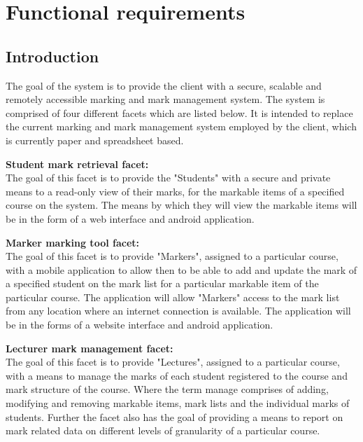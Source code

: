 \documentclass[12pt]{article}
\begin{document}
		
	
	\section{Functional requirements}
	
		\vspace{0.2in}
		
		\subsection{Introduction}
			\begin{flushleft}
				\vspace{0.2in}
	
				The goal of the system is to provide the client with a secure, scalable and remotely accessible marking and mark management system. The system is comprised of four different facets which are listed below. It is intended to replace the current marking and mark management system employed by the client, which is currently paper and spreadsheet based.
				
				\vspace{0.5cm}
				\textbf{Student mark retrieval facet:}
				\vspace{0.1in}
				\\
				The goal of this facet is to provide the "Students" with a secure and private means to a read-only view of their marks, for the markable items of a specified course on the system. The means by which they will view the markable items will be in the form of a web interface and android application.
				
				\vspace{0.5cm}
				\textbf{Marker marking tool facet:}
				\vspace{0.1in}
				\\
				The goal of this facet is to provide "Markers", assigned to a particular course, with a mobile application to allow then to be able to add and update the mark of a specified student on the mark list for a particular markable item of the particular course. The application will allow "Markers" access to the mark list from any location where an internet connection is available. The application will be in the forms of a website interface and android application.
				
				\vspace{0.5cm}
				\textbf{Lecturer mark management facet:}
				\vspace{0.1in}
				\\
				The goal of this facet is to provide "Lectures", assigned to a particular course, with a means to manage the marks of each student registered to the course and mark structure of the course. Where the term manage comprises of adding, modifying and removing markable items, mark lists and the individual marks of students. Further the facet also has the goal of providing a means to report on mark related data on different levels of granularity of a particular course.
				

\end{flushleft}
\end{document}
